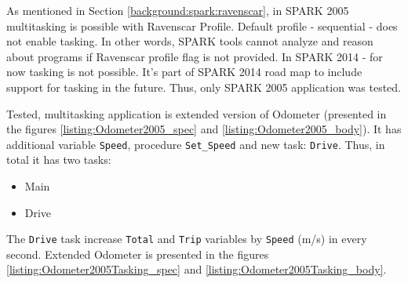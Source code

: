 As mentioned in Section \ref{background:spark:ravenscar}, in SPARK 2005 multitasking is possible with Ravenscar Profile. Default profile - sequential -  does not enable tasking. In other words, SPARK tools cannot analyze and reason about programs if Ravenscar profile flag is not provided. In SPARK 2014 - for now tasking is not possible. It's part of SPARK 2014 road map to include support for tasking in the future. Thus, only SPARK 2005 application was tested.

Tested, multitasking application is extended version of Odometer (presented in the figures \ref{listing:Odometer2005_spec} and \ref{listing:Odometer2005_body}). It has additional variable \lstinline{Speed}, procedure \lstinline{Set_Speed} and new task: \lstinline{Drive}. Thus, in total it has two tasks:
\begin{itemize}
    \item Main
    \item Drive
\end{itemize}

The \lstinline{Drive} task increase \lstinline{Total} and \lstinline{Trip} variables by \lstinline{Speed} (m/s) in every second. Extended Odometer is presented in the figures \ref{listing:Odometer2005Tasking_spec} and \ref{listing:Odometer2005Tasking_body}. 

